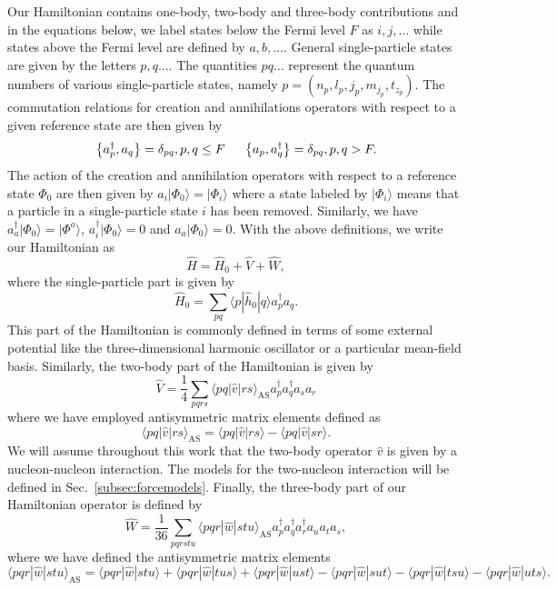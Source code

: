 \documentclass[preprint,12pt,authoryear]{elsarticle}
\begin{document}
Our Hamiltonian contains one-body, two-body and three-body contributions and in 
the equations below, we  label states below the Fermi level $F$ as $i,j,\ldots$ while states 
above the Fermi level are defined by $a,b,\ldots$. General single-particle states
are given by the letters  $p,q \dots$. The
quantities $pq\dots$ represent the quantum numbers of various
single-particle states, namely
$p=(n_p,l_p,j_p,m_{j_p},t_{z_p})$.   
The commutation relations for creation and annihilations operators with respect to
a given reference state are then given by
\[
   \left\{a_p^\dagger, a_q \right\}= \delta_{pq}, p, q \leq F \hspace{0.5cm} \left\{a_p, a_q^\dagger \right\} =
        \delta_{pq}, p, q > F.
\]
The action of the creation and annihilation operators with respect to a reference state $\Phi_0$ are then given by
 $a_i|\Phi_0\rangle = |\Phi_i\rangle$ where a state labeled by $|\Phi_i\rangle$ means that a particle in a 
single-particle state $i$ has been removed. Similarly, we have $a_a^\dagger|\Phi_0\rangle = |\Phi^a\rangle$, $a_i^\dagger|\Phi_0\rangle = 0$ 
and $a_a|\Phi_0\rangle = 0$.  With the above definitions, we write our Hamiltonian as
\[
\hat{H}=\hat{H}_0+\hat{V}+\hat{W},
\]
where 
the single-particle part is given by
 \[
    \hat{H}_0 = \sum_{pq} \langle p|\hat{h}_0|q\rangle a_p^\dagger a_q.
 \]
This part of the Hamiltonian is commonly defined in terms of some external potential like the three-dimensional 
harmonic oscillator or a particular mean-field basis. 
Similarly, the two-body part of the Hamiltonian
is given by  
\[
  \hat{V} = \frac{1}{4}\sum_{pqrs} \langle pq|\hat{v}|rs\rangle_{\mathrm{AS}} a_p^\dagger a_q^\dagger a_s a_r
\]
where we have employed antisymmetric matrix elements defined as
\[
\langle pq|\hat{v}|rs\rangle_{\mathrm{AS}}=\langle pq|\hat{v}|rs\rangle-\langle pq|\hat{v}|sr\rangle.
\]
We will assume throughout this work that the  two-body operator $\hat{v}$ is given by a nucleon-nucleon interaction.
The models for the two-nucleon interaction will be defined in Sec.~\ref{subsec:forcemodels}. 
Finally, the three-body part of our Hamiltonian operator  is defined by   
\[
   \hat{W} =\frac{1}{36} \sum_{pqrstu} \langle pqr|\hat{w}|stu\rangle_{\mathrm{AS}}a_p^\dagger a_q^\dagger a_r^\dagger a_u a_t a_s,
\]
where we have defined the antisymmetric matrix elements
\[
          \langle pqr|\hat{w}|stu\rangle_{\mathrm{AS}}= \langle pqr|\hat{w}|stu\rangle + \langle pqr|\hat{w}|tus\rangle + \langle pqr|\hat{w}|ust\rangle- \langle pqr|\hat{w}|sut\rangle - \langle pqr|\hat{w}|tsu\rangle - \langle pqr|\hat{w}|uts\rangle.
\]
\end{document}
